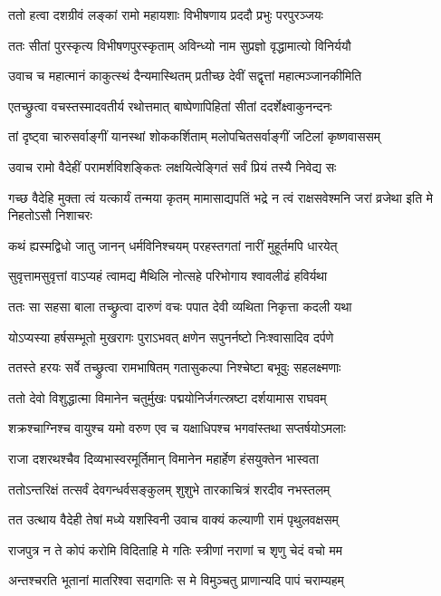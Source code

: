\twolineshloka
{ततो हत्वा दशग्रीवं लङ्कां रामो महायशाः}
{विभीषणाय प्रददौ प्रभुः परपुरञ्जयः}


\twolineshloka
{ततः सीतां पुरस्कृत्य विभीषणपुरस्कृताम्}
{अविन्ध्यो नाम सुप्रज्ञो वृद्धामात्यो विनिर्ययौ}


\twolineshloka
{उवाच च महात्मानं काकुत्स्थं दैन्यमास्थितम्}
{प्रतीच्छ देवीं सद्वृत्तां महात्मञ्जानकीमिति}


\twolineshloka
{एतच्छ्रुत्वा वचस्तस्मादवतीर्य रथोत्तमात्}
{बाष्पेणापिहितां सीतां ददर्शेक्ष्वाकुनन्दनः}


\twolineshloka
{तां दृष्ट्वा चारुसर्वाङ्गीं यानस्थां शोककर्शिताम्}
{मलोपचितसर्वाङ्गीं जटिलां कृष्णवाससम्}


\twolineshloka
{उवाच रामो वैदेहीं परामर्शविशङ्कितः}
{लक्षयित्वेङ्गितं सर्वं प्रियं तस्यै निवेद्य सः}


\threelineshloka
{गच्छ वैदेहि मुक्ता त्वं यत्कार्यं तन्मया कृतम्}
{मामासाद्यपतिं भद्रे न त्वं राक्षसवेश्मनि}
{जरां व्रजेथा इति मे निहतोऽसौ निशाचरः}


\twolineshloka
{कथं ह्यस्मद्विधो जातु जानन् धर्मविनिश्चयम्}
{परहस्तगतां नारीं मुहूर्तमपि धारयेत्}


\twolineshloka
{सुवृत्तामसुवृत्तां वाऽप्यहं त्वामद्य मैथिलि}
{नोत्सहे परिभोगाय श्वावलीढं हविर्यथा}


\twolineshloka
{ततः सा सहसा बाला तच्छ्रुत्वा दारुणं वचः}
{पपात देवी व्यथिता निकृत्ता कदली यथा}


\twolineshloka
{योऽप्यस्या हर्षसम्भूतो मुखरागः पुराऽभवत्}
{क्षणेन सपुनर्नष्टो निःश्वासादिव दर्पणे}


\twolineshloka
{ततस्ते हरयः सर्वे तच्छ्रुत्वा रामभाषितम्}
{गतासुकल्पा निश्चेष्टा बभूवुः सहलक्ष्मणाः}


\twolineshloka
{ततो देवो विशुद्धात्मा विमानेन चतुर्मुखः}
{पद्मयोनिर्जगत्स्रष्टा दर्शयामास राघवम्}


\twolineshloka
{शक्रश्चाग्निश्च वायुश्च यमो वरुण एव च}
{यक्षाधिपश्च भगवांस्तथा सप्तर्षयोऽमलाः}


\twolineshloka
{राजा दशरथश्चैव दिव्यभास्वरमूर्तिमान्}
{विमानेन महार्हेण हंसयुक्तेन भास्वता}


\twolineshloka
{ततोऽन्तरिक्षं तत्सर्वं देवगन्धर्वसङ्कुलम्}
{शुशुभे तारकाचित्रं शरदीव नभस्तलम्}


\twolineshloka
{तत उत्थाय वैदेही तेषां मध्ये यशस्विनी}
{उवाच वाक्यं कल्याणी रामं पृथुलवक्षसम्}


\twolineshloka
{राजपुत्र न ते कोपं करोमि विदिताहि मे}
{गतिः स्त्रीणां नराणां च शृणु चेदं वचो मम}


\twolineshloka
{अन्तश्चरति भूतानां मातरिश्वा सदागतिः}
{स मे विमुञ्चतु प्राणान्यदि पापं चराम्यहम्}


